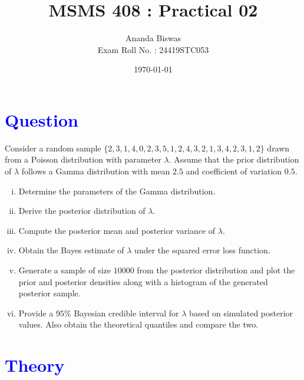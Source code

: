 \documentclass[11pt, a4paper]{article}\usepackage[]{graphicx}\usepackage[]{xcolor}
\title{MSMS 408 : Practical 02}
\author{{\fontsize{22}{20} \benyorithafont Ananda Biswas} \\[1em] Exam Roll No. : 24419STC053}
\date{\today}
\begin{document}
\maketitle


\section*{\faArrowAltCircleRight[regular] \textcolor{blue}{Question}}

\hspace{1cm} Consider a random sample $\{2, 3, 1, 4, 0, 2, 3, 5, 1, 2, 4, 3, 2, 1, 3, 4, 2, 3, 1, 2\}$ drawn from a Poisson distribution with parameter $\lambda$. Assume that the prior distribution of $\lambda$ follows a Gamma distribution with mean $2.5$ and coefficient of variation $0.5$.

\begin{enumerate}[(i)]
\item Determine the parameters of the Gamma distribution.

\item Derive the posterior distribution of $\lambda$.

\item Compute the posterior mean and posterior variance of $\lambda$.

\item Obtain the Bayes estimate of $\lambda$ under the squared error loss function.

\item Generate a sample of size $10000$ from the posterior distribution and plot the prior and posterior densities along with a histogram of the generated posterior sample.

\item Provide a $95\%$ Bayesian credible interval for $\lambda$ based on simulated posterior values. Also obtain the theoretical quantiles and compare the two.
\end{enumerate}

\section*{\faArrowAltCircleRight[regular] \textcolor{blue}{Theory}}
\end{document}
